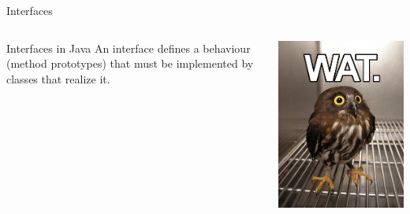 \documentclass[English,c,%
hyperref={%
  pdftitle={Java Inheritance/Interfaces},%
  pdfauthor={Muller, Gravier, Laforest, Subercaze},%
  pdfsubject={Java Inheritance/Interfaces},%
  pdfkeywords={Inheritance, Interface, Java},%
  colorlinks=true,%
  urlcolor=blue,%
  linkcolor=%
},%
xcolor={pdftex,svgnames} %
]{beamer}
\begin{document}
  \begin{frame}{Interfaces}
    \begin{columns}[t]
      \begin{column}{.55\linewidth}
        \begin{block}{Interfaces in Java}
          An interface defines a behaviour (method prototypes) that must be
          implemented by classes that realize it.
        \end{block}
      \end{column}

      \begin{column}{.40\linewidth}
        \begin{block}{}
          \includegraphics[height=0.6\textheight]{./images01/wat.png}
        \end{block}
      \end{column}
    \end{columns}

  \end{frame}
\end{document}
